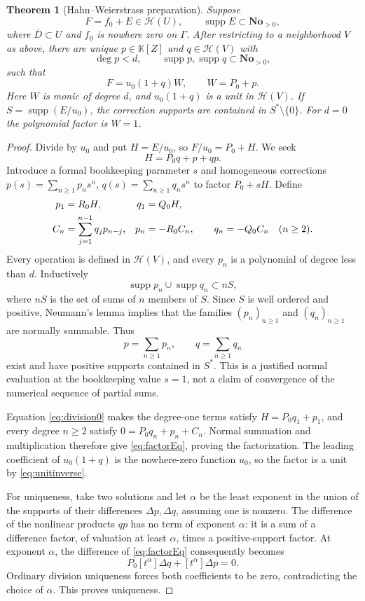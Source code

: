 \documentclass[11pt,letterpaper]{article}
\numberwithin{equation}{section}
\newtheorem{theorem}{Theorem}[section]
\theoremstyle{definition}
\theoremstyle{remark}
\newcommand{\No}{\mathbf{No}}
\newcommand{\K}{\mathbb K}
\newcommand{\HH}{\mathscr H}
\DeclareMathOperator{\supp}{supp}
\begin{document}
\begin{theorem}[Hahn--Weierstrass preparation]\label{thm:preparation}
Suppose
\begin{equation}\label{eq:perturb}
 F=f_0+E\in\HH(U),\qquad \supp E\subset\No_{>0},
\end{equation}
where $\overline D\subset U$ and $f_0$ is nowhere zero on $\Gamma$.
After restricting to a neighborhood $V$ as above, there are unique
$p\in\K[Z]$ and $q\in\HH(V)$ with
\[
 \deg p<d,\qquad \supp p,\supp q\subset\No_{>0},
\]
such that
\begin{equation}\label{eq:preparation}
 F=u_0(1+q)W,\qquad W=P_0+p.
\end{equation}
Here $W$ is monic of degree $d$, and $u_0(1+q)$ is a unit in $\HH(V)$.
If $S=\supp(E/u_0)$, the correction supports are contained in
$S^*\setminus\{0\}$. For $d=0$ the polynomial factor is $W=1$.
\end{theorem}
\begin{proof}
Divide by $u_0$ and put $H=E/u_0$, so $F/u_0=P_0+H$.
We seek
\begin{equation}\label{eq:factorEq}
 H=P_0q+p+qp.
\end{equation}
Introduce a formal bookkeeping parameter $s$ and homogeneous corrections
$p(s)=\sum_{n\ge1}p_ns^n$, $q(s)=\sum_{n\ge1}q_ns^n$ to factor
$P_0+sH$. Define
\begin{align}\label{eq:prepRecursion}
 p_1&=R_0H,&q_1&=Q_0H,\\
 C_n&=\sum_{j=1}^{n-1}q_jp_{n-j},&
 p_n&=-R_0C_n,\qquad q_n=-Q_0C_n\quad(n\ge2).\notag
\end{align}
Every operation is defined in $\HH(V)$, and every $p_n$ is a polynomial
of degree less than $d$. Inductively
\[
 \supp p_n\cup\supp q_n\subset nS,
\]
where $nS$ is the set of sums of $n$ members of $S$. Since $S$ is
well ordered and positive, Neumann's lemma implies that the families
$(p_n)_{n\ge1}$ and $(q_n)_{n\ge1}$ are normally summable. Thus
\[
 p=\sum_{n\ge1}p_n,\qquad q=\sum_{n\ge1}q_n
\]
exist and have positive supports contained in $S^*$. This is a justified
normal evaluation at the bookkeeping value $s=1$, not a claim of
convergence of the numerical sequence of partial sums.

Equation \eqref{eq:division0} makes the degree-one terms satisfy
$H=P_0q_1+p_1$, and every degree $n\ge2$ satisfy
$0=P_0q_n+p_n+C_n$. Normal summation and multiplication therefore give
\eqref{eq:factorEq}, proving the factorization. The leading coefficient
of $u_0(1+q)$ is the nowhere-zero function $u_0$, so the factor is a
unit by \eqref{eq:unitinverse}.

For uniqueness, take two solutions and let $\alpha$ be the least
exponent in the union of the supports of their differences
$\Delta p,\Delta q$, assuming one is nonzero. The difference of the
nonlinear products $qp$ has no term of exponent $\alpha$: it is a sum
of a difference factor, of valuation at least $\alpha$, times a
positive-support factor. At exponent $\alpha$, the difference of
\eqref{eq:factorEq} consequently becomes
\[
 P_0[t^\alpha]\Delta q+[t^\alpha]\Delta p=0.
\]
Ordinary division uniqueness forces both coefficients to be zero,
contradicting the choice of $\alpha$. This proves uniqueness.
\end{proof}
\end{document}
